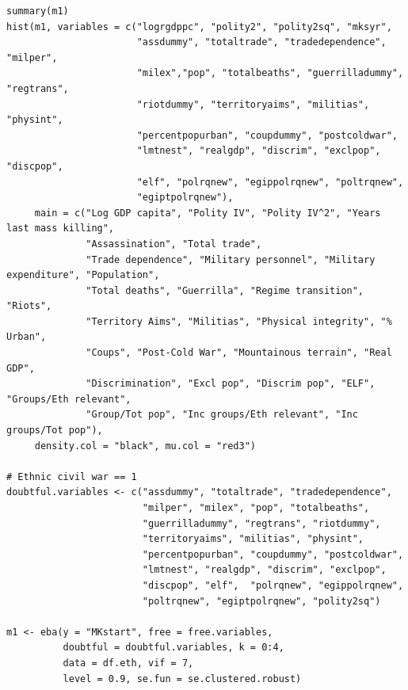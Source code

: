 \begin{verbatim}
summary(m1)
hist(m1, variables = c("logrgdppc", "polity2", "polity2sq", "mksyr",
                       "assdummy", "totaltrade", "tradedependence", "milper",
                       "milex","pop", "totalbeaths", "guerrilladummy", "regtrans",
                       "riotdummy", "territoryaims", "militias", "physint",
                       "percentpopurban", "coupdummy", "postcoldwar",
                       "lmtnest", "realgdp", "discrim", "exclpop", "discpop",
                       "elf", "polrqnew", "egippolrqnew", "poltrqnew",
                       "egiptpolrqnew"),
     main = c("Log GDP capita", "Polity IV", "Polity IV^2", "Years last mass killing",
              "Assassination", "Total trade", 
              "Trade dependence", "Military personnel", "Military expenditure", "Population", 
              "Total deaths", "Guerrilla", "Regime transition", "Riots",
              "Territory Aims", "Militias", "Physical integrity", "% Urban",
              "Coups", "Post-Cold War", "Mountainous terrain", "Real GDP",
              "Discrimination", "Excl pop", "Discrim pop", "ELF", "Groups/Eth relevant", 
              "Group/Tot pop", "Inc groups/Eth relevant", "Inc groups/Tot pop"),
     density.col = "black", mu.col = "red3")
     
# Ethnic civil war == 1
doubtful.variables <- c("assdummy", "totaltrade", "tradedependence",
                        "milper", "milex", "pop", "totalbeaths",
                        "guerrilladummy", "regtrans", "riotdummy",
                        "territoryaims", "militias", "physint",
                        "percentpopurban", "coupdummy", "postcoldwar",
                        "lmtnest", "realgdp", "discrim", "exclpop", 
                        "discpop", "elf",  "polrqnew", "egippolrqnew",
                        "poltrqnew", "egiptpolrqnew", "polity2sq")

m1 <- eba(y = "MKstart", free = free.variables,
          doubtful = doubtful.variables, k = 0:4,
          data = df.eth, vif = 7,
          level = 0.9, se.fun = se.clustered.robust)
          

\end{verbatim}
